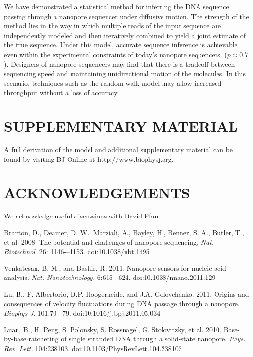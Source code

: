 \documentclass{biophys_letter}
\begin{document}
\begin{multicols}{2}
We have demonstrated a statistical method for inferring the DNA sequence passing through a nanopore sequencer under diffusive motion.
The strength of the method lies in the way in which multiple reads of the input sequence are independently modeled and then iteratively combined to yield a joint estimate of the true sequence.
Under this model, accurate sequence inference is achievable even within the experimental constraints of today's nanopore sequencers. ($p \approx 0.7$).
Designers of nanopore sequencers may find that there is a tradeoff between sequencing speed and maintaining unidirectional motion of the molecules.
In this scenario, techniques such as the random walk model may allow increased throughput without a loss of accuracy.

\section*{SUPPLEMENTARY MATERIAL}

A full derivation of the model and additional supplementary material can be found by visiting BJ Online at http://www.biophysj.org.\vspace*{6pt}

\section*{ACKNOWLEDGEMENTS}

We acknowledge useful discussions with David Pfau.

\begin{thebibliography}{99}

  Branton, D., Deamer, D. W., Marziali, A., Bayley, H., Benner, S. A., Butler, T., et al.
  2008.
  The potential and challenges of nanopore sequencing.
  {\it Nat. Biotechnol.}
  26: 1146-–1153.
  doi:10.1038/nbt.1495

  Venkatesan, B. M., and Bashir, R.
  2011.
  Nanopore sensors for nucleic acid analysis.
  {\it Nat. Nanotechnology.}
  6:615–-624.
  doi:10.1038/nnano.2011.129

  Lu, B., F. Albertorio, D.P. Hoogerheide, and J.A. Golovchenko.
  2011.
  Origins and consequences of velocity fluctuations during DNA passage through a nanopore.
  {\it Biophys J.}
  101:70–-79.
  doi:10.1016/j.bpj.2011.05.034

  Luan, B., H. Peng, S. Polonsky, S. Rossnagel, G. Stolovitzky, et al.
  2010.
  Base-by-base ratcheting of single stranded DNA through a solid-state nanopore.
  {\it Phys. Rev. Lett.}
  104:238103.
  doi:10.1103/PhysRevLett.104.238103


\end{thebibliography}
\end{multicols}
\end{document}
